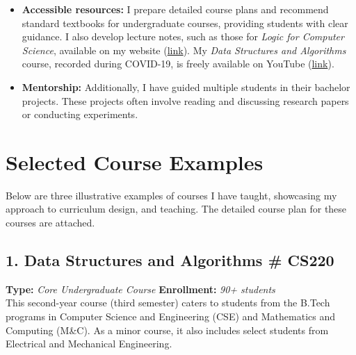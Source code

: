\documentclass[11pt,a4paper,sans]{moderncv} %
\begin{document}
\begin{itemize}
    \item \textbf{Accessible resources:} I prepare detailed course plans and recommend standard textbooks for undergraduate courses, providing students with clear guidance. I also develop lecture notes, such as those for \emph{Logic for Computer Science}, available on my website (\href{http://www.iitgoa.ac.in/~sreejithav/18July/logic/logicNotes.pdf}{link}). My \emph{Data Structures and Algorithms} course, recorded during COVID-19, is freely available on YouTube (\href{https://www.youtube.com/playlist?list=PLgOvAyZGFRoSKBxqG9lbhtz9cVeLDsZnp}{link}).


    \item \textbf{Mentorship:} Additionally, I have guided multiple students in their bachelor projects. These projects often involve reading and discussing research papers or conducting experiments.

\end{itemize}

\section{Selected Course Examples}
Below are three illustrative examples of courses I have taught, showcasing my approach to curriculum design, and teaching. The detailed course plan for these courses are attached.

\subsection*{1. Data Structures and Algorithms \null\hfill \# CS220}
\textbf{Type:} \emph{Core Undergraduate Course} \null\hfill \textbf{Enrollment:} \emph{90+ students} \\
This second-year course (third semester) caters to students from the B.Tech programs in Computer Science and Engineering (CSE) and Mathematics and Computing (M\&C). As a minor course, it also includes select students from Electrical and Mechanical Engineering.
\end{document}
